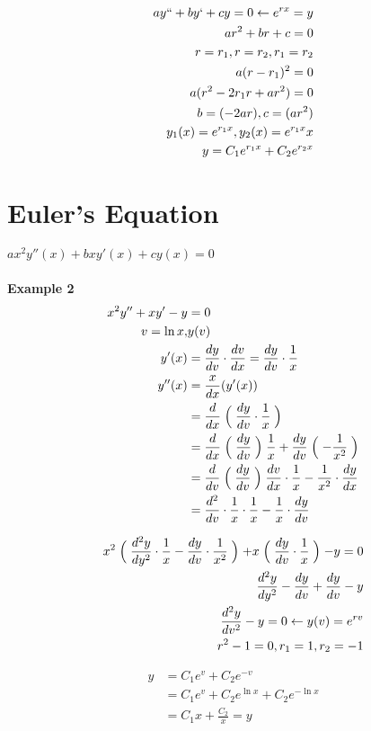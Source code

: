 \documentclass[10pt, letterpaper]{article}
\begin{document}
\begin{align*}
ay`` +by` +cy =0 \leftarrow e^{rx} =y\\
ar^2 +br +c=0\\
r=r_1, r=r_2, r_1=r_2\\
a(r-r_1)^2 =0\\
a(r^2 -2r_1r +ar^2) =0\\
b=(-2ar), c=(ar^2)\\
y_1(x) =e^{r_1x}, y_2(x) =e^{r_1x}x\\
y =C_1e^{r_1x} +C_2e^{r_2x}
\end{align*}

\section{Euler's Equation}
$ax^2y''(x) +bxy'(x) +cy(x) =0$\\
\\
\textbf{Example 2}
\begin{align*}
x^2y'' +xy' -y &=0\\
v = \ln x, &y(v)\\
y'(x) &= \frac{dy}{dv} \cdot \frac{dv}{dx} = \frac{dy}{dv} \cdot \frac{1}{x}\\
y''(x) &= \frac{x}{dx} (y'(x))\\
&= \frac{d}{dx} \Bigm( \frac{dy}{dv} \cdot \frac{1}{x} \Bigm)\\
&= \frac{d}{dx} \Bigm( \frac{dy}{dv} \Bigm) \frac{1}{x} + \frac{dy}{dv} \Bigm( -\frac{1}{x^2} \Bigm)\\
&= \frac{d}{dv} \Bigm( \frac{dy}{dv} \Bigm) \frac{dv}{dx} \cdot \frac{1}{x} - \frac{1}{x^2} \cdot \frac{dy}{dx}\\
&= \frac{d^2}{dv} \cdot \frac{1}{x} \cdot \frac{1}{x} - \frac{1}{x} \cdot \frac{dy}{dv}
\end{align*}

\begin{align*}
x^2 \Bigm( \frac{d^2y}{dy^2} \cdot \frac{1}{x} - \frac{dy}{dv} \cdot \frac{1}{x^2} \Bigm) + x \Bigm( \frac{dy}{dv} \cdot \frac{1}{x} \Bigm) -y =0\\
\frac{d^2y}{dy^2} - \frac{dy}{dv} + \frac{dy}{dv} - y\\
\frac{d^2y}{dv^2} - y = 0 \leftarrow y(v) = e^{rv}\\
r^2-1=0, r_1=1, r_2=-1
\end{align*}

\begin{align*}
y &= C_1e^v +C_2e^{-v}\\
&= C_1e^v +C_2e^{\ln x} +C_2e^{-\ln x}\\
&= C_1x + \frac{C_2}{x} = y
\end{align*}
\end{document}
